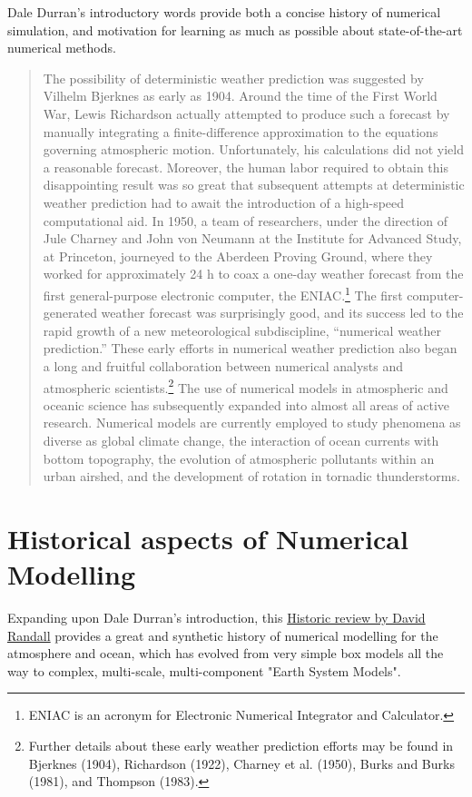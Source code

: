 \documentclass[11pt,fleqn]{book} %
\begin{document}
	Dale Durran's introductory words provide both a concise history of numerical simulation, and motivation for learning as much as possible about state-of-the-art numerical methods.
	
	\begin{quotation}
	The possibility of deterministic weather prediction was suggested by Vilhelm Bjerknes as early as 1904. Around the time of the First World War, Lewis Richardson actually attempted to produce such a forecast by manually integrating a finite-difference approximation to the equations governing atmospheric motion. Unfortunately, his calculations did not yield a reasonable forecast. Moreover, the human labor required to obtain this disappointing result was so great that subsequent attempts at deterministic weather prediction had to await the introduction of a high-speed computational aid. In 1950, a team of researchers, under the direction of Jule Charney and John von Neumann at the Institute for Advanced Study, at Princeton, journeyed to the Aberdeen Proving Ground, where they worked for approximately 24 h to coax a one-day weather forecast from the first general-purpose electronic computer, the ENIAC.\footnote{ENIAC is an acronym for Electronic Numerical Integrator and Calculator.} The first computer-generated weather forecast was surprisingly good, and its success led to the rapid growth of a new meteorological subdiscipline, “numerical weather prediction.” These early efforts in numerical weather prediction also began a long and fruitful collaboration between numerical analysts and atmospheric scientists.\footnote{Further details about these early weather prediction efforts may be found in Bjerknes (1904), Richardson (1922), Charney et al. (1950), Burks and Burks (1981), and Thompson (1983).} The use of numerical models in atmospheric and oceanic science has subsequently expanded into almost all areas of active research. Numerical models are currently employed to study phenomena as diverse as global climate change, the interaction of ocean currents with bottom topography, the evolution of atmospheric pollutants within an urban airshed, and the development of rotation in tornadic thunderstorms.
	\end{quotation}

	\section{Historical aspects of Numerical Modelling}
	
	Expanding upon Dale Durran's introduction, this \href{https://journals.ametsoc.org/view/journals/amsm/59/1/amsmonographs-d-18-0018.1.xml}{Historic review by David Randall} provides a great and synthetic history of numerical modelling for the atmosphere and ocean, which has evolved from very simple box models all the way to complex, multi-scale, multi-component "Earth System Models". \\
	
\end{document}
